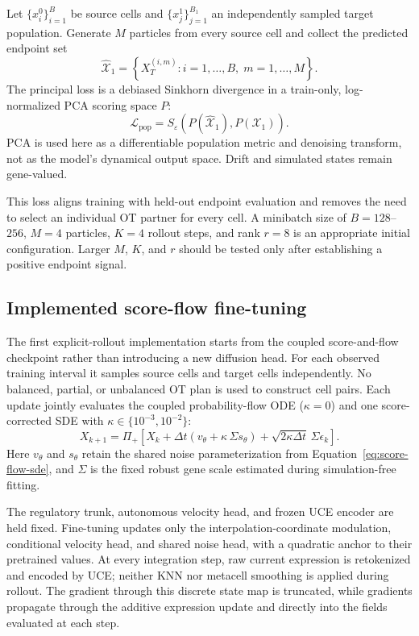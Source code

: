 \documentclass[11pt]{article}
\newcommand{\uce}{UCE}
\begin{document}
Let $\{x_i^0\}_{i=1}^{B}$ be source cells and
$\{x_j^1\}_{j=1}^{B_1}$ an independently sampled target population. Generate
$M$ particles from every source cell and collect the predicted endpoint set
\begin{equation}
  \widehat{\mathcal X}_1
  = \left\{X_T^{(i,m)}: i=1,\ldots,B,\;m=1,\ldots,M\right\}.
\end{equation}
The principal loss is a debiased Sinkhorn divergence in a train-only,
log-normalized PCA scoring space $P$:
\begin{equation}
  \mathcal L_{\mathrm{pop}}
  = S_\varepsilon\!\left(
      P(\widehat{\mathcal X}_1),
      P(\mathcal X_1)
    \right).
  \label{eq:sinkhorn}
\end{equation}
PCA is used here as a differentiable population metric and denoising transform,
not as the model's dynamical output space. Drift and simulated states remain
gene-valued.

This loss aligns training with held-out endpoint evaluation and removes the
need to select an individual OT partner for every cell. A minibatch size of
$B=128$--$256$, $M=4$ particles, $K=4$ rollout steps, and rank $r=8$ is an
appropriate initial configuration. Larger $M$, $K$, and $r$ should be tested
only after establishing a positive endpoint signal.

\subsection{Implemented score-flow fine-tuning}

The first explicit-rollout implementation starts from the coupled
score-and-flow checkpoint rather than introducing a new diffusion head. For
each observed training interval it samples source cells and target cells
independently. No balanced, partial, or unbalanced OT plan is used to construct
cell pairs. Each update jointly evaluates the coupled probability-flow ODE
($\kappa=0$) and one score-corrected SDE with
$\kappa\in\{10^{-3},10^{-2}\}$:
\begin{equation}
  X_{k+1}=\Pi_+\!\left[X_k+\Delta t
  \left(v_\theta+\kappa\,\Sigma s_\theta\right)
  +\sqrt{2\kappa\Delta t}\,\Sigma\epsilon_k\right].
  \label{eq:implemented-rollout}
\end{equation}
Here $v_\theta$ and $s_\theta$ retain the shared noise parameterization from
Equation~\ref{eq:score-flow-sde}, and $\Sigma$ is the fixed robust gene scale
estimated during simulation-free fitting.

The regulatory trunk, autonomous velocity head, and frozen \uce{} encoder are
held fixed. Fine-tuning updates only the interpolation-coordinate modulation,
conditional velocity head, and shared noise head, with a quadratic anchor to
their pretrained values. At every integration step, raw current expression is
retokenized and encoded by \uce{}; neither KNN nor metacell smoothing is
applied during rollout. The gradient through this discrete state map is
truncated, while gradients propagate through the additive expression update
and directly into the fields evaluated at each step.
\end{document}
